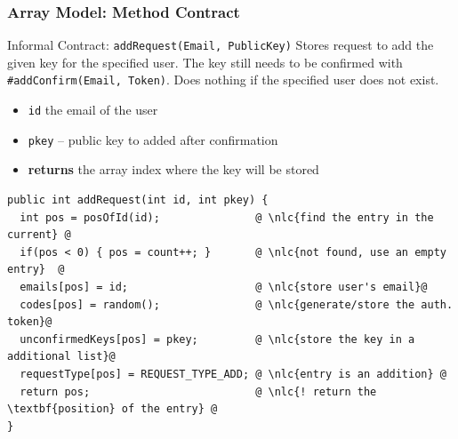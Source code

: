 \documentclass{beamer}
\begin{document}
\begin{frame}[fragile]
    \frametitle{Array Model: Method Contract}
    \begin{block}{Informal Contract: \texttt{addRequest(Email, PublicKey)}}
      Stores request to add the given key for the specified user. The key still
      needs to be confirmed with \texttt{\#addConfirm(Email, Token)}. Does nothing if
      the specified user does not exist.
     
    \begin{itemize}
    \item \texttt{id} the email of the user
     \item \texttt{pkey}  -- public key to added after confirmation
     \item \textbf{returns} the array index where the key will be stored
    \end{itemize}
     
    \end{block}

    \newcommand{\nlc}[1]{\textcolor{green!60!black}{// #1}}

    \begin{lstlisting}[escapechar=@]
public int addRequest(int id, int pkey) {
  int pos = posOfId(id);               @ \nlc{find the entry in the current} @
  if(pos < 0) { pos = count++; }       @ \nlc{not found, use an empty entry}  @
  emails[pos] = id;                    @ \nlc{store user's email}@
  codes[pos] = random();               @ \nlc{generate/store the auth. token}@
  unconfirmedKeys[pos] = pkey;         @ \nlc{store the key in a additional list}@
  requestType[pos] = REQUEST_TYPE_ADD; @ \nlc{entry is an addition} @
  return pos;                          @ \nlc{! return the \textbf{position} of the entry} @
}\end{lstlisting}

\end{frame}
\end{document}
